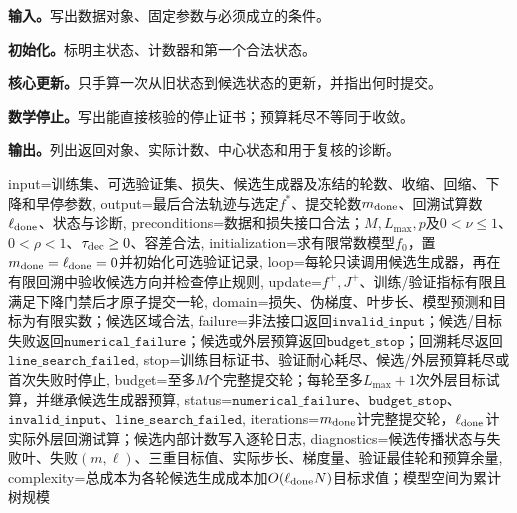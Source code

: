 
\begin{keypointbox}[title={一般损失下的梯度提升树：验收与提交：五步阅读}]
\textbf{输入。}写出数据对象、固定参数与必须成立的条件。\par
\textbf{初始化。}标明主状态、计数器和第一个合法状态。\par
\textbf{核心更新。}只手算一次从旧状态到候选状态的更新，并指出何时提交。\par
\textbf{数学停止。}写出能直接核验的停止证书；预算耗尽不等同于收敛。\par
\textbf{输出。}列出返回对象、实际计数、中心状态和用于复核的诊断。
\end{keypointbox}

\begin{AlgorithmContract}{
  input={训练集、可选验证集、损失、候选生成器及冻结的轮数、收缩、回缩、下降和早停参数},
  output={最后合法轨迹与选定$f^*$、提交轮数$m_{\rm done}$、回溯试算数$\ell_{\rm done}$、状态与诊断},
  preconditions={数据和损失接口合法；$M,L_{\max},p$及$0<\nu\le1$、$0<\rho<1$、$\tau_{\rm dec}\ge0$、容差合法},
  initialization={求有限常数模型$f_0$，置$m_{\rm done}=\ell_{\rm done}=0$并初始化可选验证记录},
  loop={每轮只读调用候选生成器，再在有限回溯中验收候选方向并检查停止规则},
  update={$f^+,J^+$、训练/验证指标有限且满足下降门禁后才原子提交一轮},
  domain={损失、伪梯度、叶步长、模型预测和目标为有限实数；候选区域合法},
  failure={非法接口返回$\mathtt{invalid\_input}$；候选/目标失败返回$\mathtt{numerical\_failure}$；候选或外层预算返回$\mathtt{budget\_stop}$；回溯耗尽返回$\mathtt{line\_search\_failed}$},
  stop={训练目标证书、验证耐心耗尽、候选/外层预算耗尽或首次失败时停止},
  budget={至多$M$个完整提交轮；每轮至多$L_{\max}+1$次外层目标试算，并继承候选生成器预算},
  status={$\mathtt{numerical\_failure}$、$\mathtt{budget\_stop}$、$\mathtt{invalid\_input}$、$\mathtt{line\_search\_failed}$},
  iterations={$m_{\rm done}$计完整提交轮，$\ell_{\rm done}$计实际外层回溯试算；候选内部计数写入逐轮日志},
  diagnostics={候选传播状态与失败叶、失败$(m,\ell)$、三重目标值、实际步长、梯度量、验证最佳轮和预算余量},
  complexity={总成本为各轮候选生成成本加$O(\ell_{\rm done}N)$目标求值；模型空间为累计树规模}
}
\begin{algorithm}[H]
\caption{一般损失下的梯度提升树：验收与提交}\label{alg:V3-C03-gradient-boost}

\end{algorithm}
\end{AlgorithmContract}
